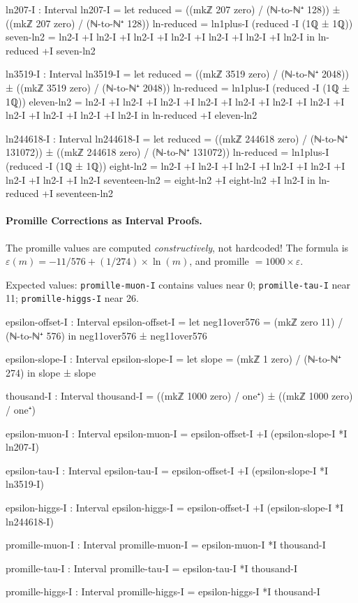 \documentclass[11pt,a4paper]{book}
\begin{document}
\begin{code}
ln207-I : Interval
ln207-I = 
  let reduced = ((mkℤ 207 zero) / (ℕ-to-ℕ⁺ 128)) ± ((mkℤ 207 zero) / (ℕ-to-ℕ⁺ 128))
      ln-reduced = ln1plus-I (reduced -I (1ℚ ± 1ℚ))
      seven-ln2 = ln2-I +I ln2-I +I ln2-I +I ln2-I +I ln2-I +I ln2-I +I ln2-I
  in ln-reduced +I seven-ln2

ln3519-I : Interval
ln3519-I = 
  let reduced = ((mkℤ 3519 zero) / (ℕ-to-ℕ⁺ 2048)) ± ((mkℤ 3519 zero) / (ℕ-to-ℕ⁺ 2048))
      ln-reduced = ln1plus-I (reduced -I (1ℚ ± 1ℚ))
      eleven-ln2 = ln2-I +I ln2-I +I ln2-I +I ln2-I +I ln2-I +I ln2-I +I ln2-I +I ln2-I +I ln2-I +I ln2-I +I ln2-I
  in ln-reduced +I eleven-ln2

ln244618-I : Interval
ln244618-I = 
  let reduced = ((mkℤ 244618 zero) / (ℕ-to-ℕ⁺ 131072)) ± ((mkℤ 244618 zero) / (ℕ-to-ℕ⁺ 131072))
      ln-reduced = ln1plus-I (reduced -I (1ℚ ± 1ℚ))
      eight-ln2 = ln2-I +I ln2-I +I ln2-I +I ln2-I +I ln2-I +I ln2-I +I ln2-I +I ln2-I
      seventeen-ln2 = eight-ln2 +I eight-ln2 +I ln2-I
  in ln-reduced +I seventeen-ln2

\end{code}

\paragraph{Promille Corrections as Interval Proofs.}
The promille values are computed \emph{constructively}, not hardcoded!
The formula is $\varepsilon(m) = -11/576 + (1/274) \times \ln(m)$, and
promille $= 1000 \times \varepsilon$.

Expected values: \texttt{promille-muon-I} contains values near 0;
\texttt{promille-tau-I} near 11; \texttt{promille-higgs-I} near 26.

\begin{code}
epsilon-offset-I : Interval
epsilon-offset-I = 
  let neg11over576 = (mkℤ zero 11) / (ℕ-to-ℕ⁺ 576)
  in neg11over576 ± neg11over576

epsilon-slope-I : Interval  
epsilon-slope-I = 
  let slope = (mkℤ 1 zero) / (ℕ-to-ℕ⁺ 274)
  in slope ± slope

thousand-I : Interval
thousand-I = ((mkℤ 1000 zero) / one⁺) ± ((mkℤ 1000 zero) / one⁺)

epsilon-muon-I : Interval
epsilon-muon-I = epsilon-offset-I +I (epsilon-slope-I *I ln207-I)

epsilon-tau-I : Interval
epsilon-tau-I = epsilon-offset-I +I (epsilon-slope-I *I ln3519-I)

epsilon-higgs-I : Interval
epsilon-higgs-I = epsilon-offset-I +I (epsilon-slope-I *I ln244618-I)

promille-muon-I : Interval
promille-muon-I = epsilon-muon-I *I thousand-I

promille-tau-I : Interval
promille-tau-I = epsilon-tau-I *I thousand-I

promille-higgs-I : Interval
promille-higgs-I = epsilon-higgs-I *I thousand-I

\end{code}
\end{document}
